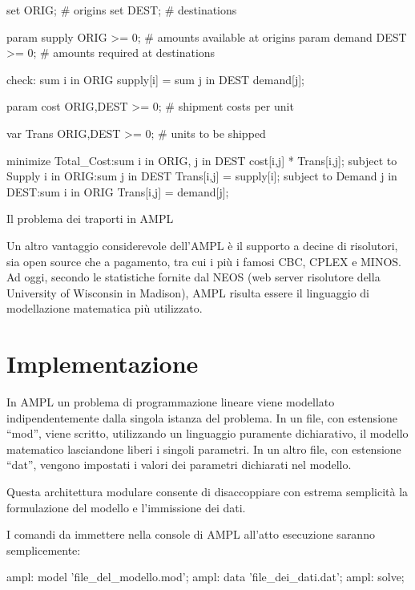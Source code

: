 		\begin{listing}[H]
			\begin{amplcode}
				set ORIG;						# origins
				set DEST;						# destinations

				param supply {ORIG} >= 0;		# amounts available at origins
				param demand {DEST} >= 0;		# amounts required at destinations

				check: sum {i in ORIG} supply[i] = sum {j in DEST} demand[j];
				
				param cost {ORIG,DEST} >= 0;	# shipment costs per unit
				
				var Trans {ORIG,DEST} >= 0;		# units to be shipped

				minimize Total_Cost:sum {i in ORIG, j in DEST} cost[i,j] * Trans[i,j];
				subject to Supply {i in ORIG}:sum {j in DEST} Trans[i,j] = supply[i];
				subject to Demand {j in DEST}:sum {i in ORIG} Trans[i,j] = demand[j];

			\end{amplcode}
			\caption{Il problema dei traporti in AMPL}
			\label{code:ampl_example}
		\end{listing}

		Un altro vantaggio considerevole dell’AMPL è il supporto a decine di risolutori, sia open source che a pagamento, tra cui i più i famosi CBC, CPLEX e MINOS.
		Ad oggi, secondo le statistiche fornite dal NEOS (web server risolutore della University of Wisconsin in Madison), AMPL risulta essere il linguaggio di modellazione matematica più utilizzato.

	\section{Implementazione} %
	\label{sec:implementazione}
		In AMPL un problema di programmazione lineare viene modellato indipendentemente dalla singola istanza del problema. In un file, con estensione “mod”, viene scritto, utilizzando un linguaggio puramente dichiarativo, il modello matematico lasciandone liberi i singoli parametri. In un altro file, con estensione “dat”, vengono impostati i valori dei parametri dichiarati nel modello.
		
		Questa architettura modulare consente di disaccoppiare con estrema semplicità la formulazione del modello e l’immissione dei dati.

		I comandi da immettere nella console di AMPL all’atto esecuzione saranno semplicemente:	
		\begin{amplcode}
			ampl: model 'file_del_modello.mod';
			ampl: data 'file_dei_dati.dat';
			ampl: solve;
		\end{amplcode}

